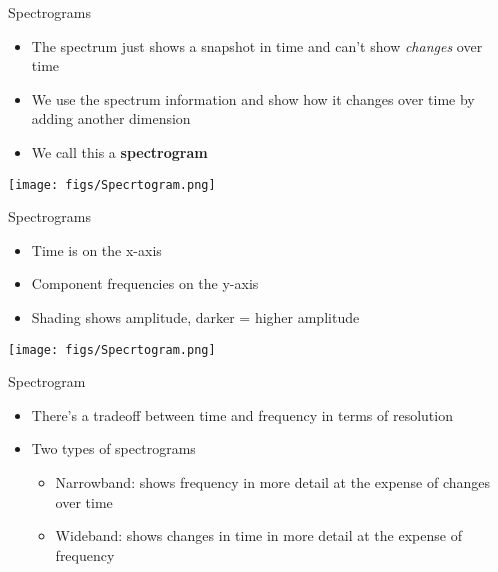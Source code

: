 \documentclass[professionalfonts]{beamer}
\begin{document}
\begin{frame}{Spectrograms}
    \begin{multicols}{2}
        \begin{itemize}
            \item The spectrum just shows a snapshot in time and can’t show \textit{changes} over time
            \item We use the spectrum information and show how it changes over time by adding another dimension
            \item We call this a \textbf{spectrogram}
        \end{itemize}

        \columnbreak

        \texttt{[image: figs/Specrtogram.png]}
    \end{multicols}
\end{frame}

\begin{frame}{Spectrograms}
    \begin{multicols}{2}
        \begin{itemize}
            \item Time is on the x-axis
            \item Component frequencies on the y-axis
            \item Shading shows amplitude, darker = higher amplitude
        \end{itemize}

        \columnbreak

        \texttt{[image: figs/Specrtogram.png]}
    \end{multicols}
\end{frame}

\begin{frame}{Spectrogram}
    \begin{itemize}
        \item There’s a tradeoff between time and frequency in terms of resolution
        \item Two types of spectrograms
        \begin{itemize}
            \item Narrowband: shows frequency in more detail at the expense of changes over time
            \item Wideband: shows changes in time in more detail at the expense of frequency
        \end{itemize}
    \end{itemize}
\end{frame}
\end{document}
